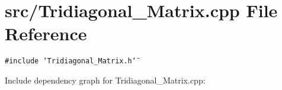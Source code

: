 \section{src/Tridiagonal\_\-Matrix.cpp File Reference}
\label{Tridiagonal__Matrix_8cpp}
{\tt \#include \char`\"{}Tridiagonal\_\-Matrix.h\char`\"{}}\par


Include dependency graph for Tridiagonal\_\-Matrix.cpp: